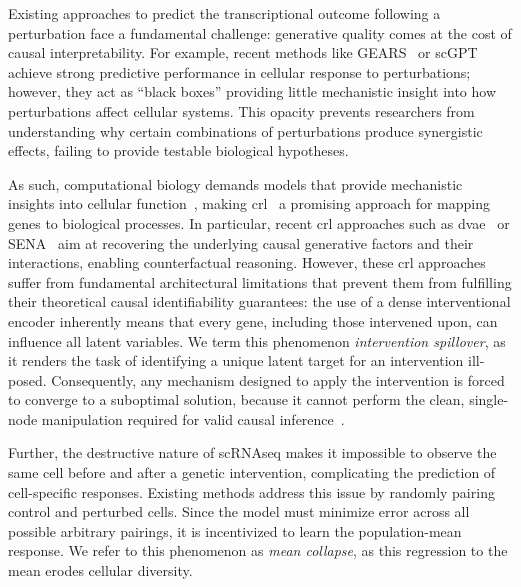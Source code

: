 \documentclass[10pt,letterpaper]{article}
\theoremstyle{definition}
\theoremstyle{remark}
\begin{document}
Existing approaches to predict the transcriptional outcome following a perturbation face a fundamental challenge: generative quality comes at the cost of causal interpretability.
For example, recent methods like GEARS~\cite{roohani2022gears} or scGPT~\cite{cui2024scgpt} achieve strong predictive performance in cellular response to perturbations; however, they act as ``black boxes'' providing little mechanistic insight into how perturbations affect cellular systems.
This opacity prevents researchers from understanding why certain combinations of perturbations produce synergistic effects, failing to provide testable biological hypotheses.

As such, computational biology demands models that provide mechanistic insights into cellular function~\cite{chen_applying_2024}, making \gls{crl}~\cite{scholkopf2021toward} a promising approach for mapping genes to biological processes.
In particular, recent \gls{crl} approaches such as \gls{dvae}~\cite{zhang2023identifiability} or SENA~\cite{de2025interpretable} aim at recovering the underlying causal generative factors and their interactions, enabling counterfactual reasoning.
However, these \gls{crl} approaches suffer from fundamental architectural limitations that prevent them from fulfilling their theoretical causal identifiability guarantees: the use of a dense interventional encoder inherently means that every gene, including those intervened upon, can influence all latent variables.
We term this phenomenon \emph{intervention spillover}, as it renders the task of identifying a unique latent target for an intervention ill-posed.
Consequently, any mechanism designed to apply the intervention is forced to converge to a suboptimal solution, because it cannot perform the clean, single-node manipulation required for valid causal inference~\cite{brehmer2022weakly,lippe2022citris}.

Further, the destructive nature of \gls{scRNAseq} makes it impossible to observe the same cell before and after a genetic intervention, complicating the prediction of cell-specific responses.
Existing methods address this issue by randomly pairing control and perturbed cells.
Since the model must minimize error across all possible arbitrary pairings, it is incentivized to learn the population-mean response.
We refer to this phenomenon as \emph{mean collapse}, as this regression to the mean erodes cellular diversity.
\end{document}
